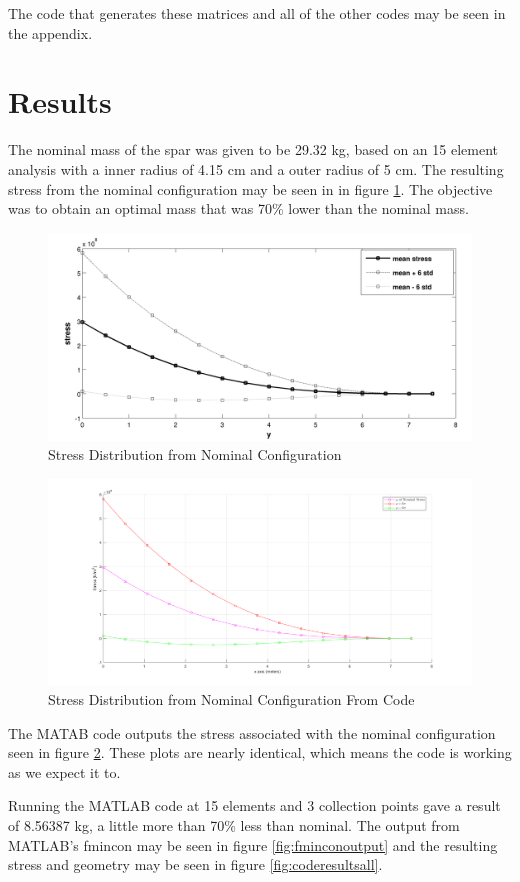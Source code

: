 \documentclass[12pt]{article}
\begin{document}
	
	
	 The code that generates these matrices and all of the other codes may be seen in the appendix. 
	
	\section{Results}
	
	The nominal mass of the spar was given to be 29.32 kg, based on an 15 element analysis with a inner radius of 4.15 cm and a outer radius of 5 cm. The resulting stress from the nominal configuration may be seen in in figure \ref{fig:nomstress}. The objective was to obtain an optimal mass that was 70\% lower than the nominal mass.  
	
	\begin{figure}[H]
		\centering
		\includegraphics[width=0.7\linewidth]{nomStress}
		\caption{Stress Distribution from Nominal Configuration}
		\label{fig:nomstress}
	\end{figure}
\begin{figure}[H]
	\centering
	\includegraphics[width=0.7\linewidth]{codeNomMass}
	\caption{Stress Distribution from Nominal Configuration From Code}
	\label{fig:codenommass}
\end{figure}

	The MATAB code outputs the stress associated with the nominal configuration seen in figure \ref{fig:codenommass}. These plots are nearly identical, which means the code is working as we expect it to. 
	
	Running the MATLAB code at 15 elements and 3 collection points gave a result of 8.56387 kg, a little more than 70\% less than nominal. The output from MATLAB's fmincon may be seen in figure \ref{fig:fminconoutput} and the resulting stress and geometry may be seen in figure \ref{fig:coderesultsall}. 
	
\end{document}
